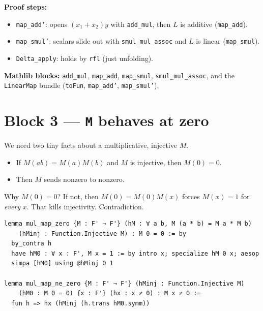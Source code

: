 \documentclass[11pt]{article}
\begin{document}
\textbf{Proof steps:}
\begin{itemize}
  \item \texttt{map\_add'}: opens $(x_1+x_2)y$ with \texttt{add\_mul}, then $L$
        is additive (\texttt{map\_add}).
  \item \texttt{map\_smul'}: scalars slide out with \texttt{smul\_mul\_assoc}
        and $L$ is linear (\texttt{map\_smul}).
  \item \texttt{Delta\_apply}: holds by \texttt{rfl} (just unfolding).
\end{itemize}

\textbf{Mathlib blocks:} \texttt{add\_mul}, \texttt{map\_add},
\texttt{map\_smul}, \texttt{smul\_mul\_assoc}, and the \texttt{LinearMap}
bundle (\texttt{toFun}, \texttt{map\_add'}, \texttt{map\_smul'}).

\section{Block 3 --- \texttt{M} behaves at zero}

We need two tiny facts about a multiplicative, injective $M$.

\begin{itemize}
  \item If $M(ab)=M(a)M(b)$ and $M$ is injective, then $M(0)=0$.
  \item Then $M$ sends nonzero to nonzero.
\end{itemize}

Why $M(0)=0$?
If not, then $M(0)=M(0)M(x)$ forces $M(x)=1$ for \emph{every} $x$.
That kills injectivity.  Contradiction.

\begin{center}
\end{center}

\begin{lstlisting}
lemma mul_map_zero {M : F' → F'} (hM : ∀ a b, M (a * b) = M a * M b)
    (hMinj : Function.Injective M) : M 0 = 0 := by
  by_contra h
  have hM0 : ∀ x : F', M x = 1 := by intro x; specialize hM 0 x; aesop
  simpa [hM0] using @hMinj 0 1

lemma mul_map_ne_zero {M : F' → F'} (hMinj : Function.Injective M)
    (hM0 : M 0 = 0) {x : F'} (hx : x ≠ 0) : M x ≠ 0 :=
  fun h => hx (hMinj (h.trans hM0.symm))
\end{lstlisting}
\end{document}
